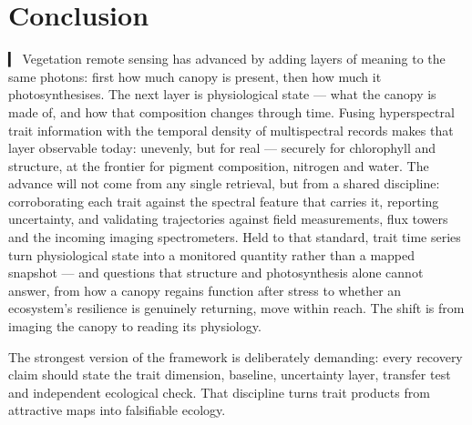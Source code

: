 \documentclass[pdflatex,sn-mathphys-num]{sn-jnl}
\begin{document}
\section{Conclusion}
▎ Vegetation remote sensing has advanced by adding layers of meaning to the same photons: first how much canopy is present, then how much it photosynthesises. The next layer is physiological state — what the canopy is made of, and how that composition changes through time. Fusing hyperspectral trait information with the temporal density of multispectral records makes that layer observable today: unevenly, but for real — securely for chlorophyll and structure, at the frontier for pigment composition, nitrogen and water. The advance will not come from any single retrieval, but from a shared discipline: corroborating each trait against the spectral feature that carries it, reporting uncertainty, and validating trajectories against field measurements, flux towers and the incoming imaging spectrometers. Held to that standard, trait time series turn physiological state into a monitored quantity rather than a mapped snapshot — and questions that structure and photosynthesis alone cannot answer, from how a canopy regains function after stress to whether an ecosystem's resilience is genuinely returning, move within reach. The shift is from imaging the canopy to reading its physiology.


The strongest version of the framework is deliberately demanding: every recovery claim should state the trait dimension, baseline, uncertainty layer, transfer test and independent ecological check. That discipline turns trait products from attractive maps into falsifiable ecology.
\end{document}
